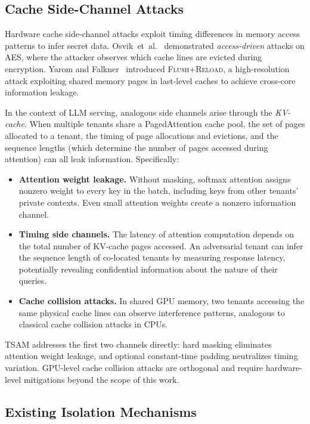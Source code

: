 \documentclass[11pt]{article}
\begin{document}
\subsection{Cache Side-Channel Attacks}
\label{sec:bg_sidechannel}

Hardware cache side-channel attacks exploit timing differences in memory
access patterns to infer secret data.
Osvik~et~al.~\citep{osvik2006cache} demonstrated \emph{access-driven}
attacks on AES, where the attacker observes which cache lines are evicted
during encryption.  Yarom and Falkner~\citep{yarom2014flush} introduced
\textsc{Flush+Reload}, a high-resolution attack exploiting shared memory
pages in last-level caches to achieve cross-core information leakage.

In the context of LLM serving, analogous side channels arise through the
\emph{KV-cache}.  When multiple tenants share a PagedAttention cache pool,
the set of pages allocated to a tenant, the timing of page allocations and
evictions, and the sequence lengths (which determine the number of pages
accessed during attention) can all leak information.  Specifically:
\begin{itemize}[leftmargin=*,itemsep=2pt]
  \item \textbf{Attention weight leakage.} Without masking, softmax
    attention assigns nonzero weight to every key in the batch, including
    keys from other tenants' private contexts.  Even small attention
    weights create a nonzero information channel.
  \item \textbf{Timing side channels.} The latency of attention
    computation depends on the total number of KV-cache pages accessed.
    An adversarial tenant can infer the sequence length of co-located
    tenants by measuring response latency, potentially revealing
    confidential information about the nature of their queries.
  \item \textbf{Cache collision attacks.} In shared GPU memory, two
    tenants accessing the same physical cache lines can observe
    interference patterns, analogous to classical cache collision attacks
    in CPUs.
\end{itemize}
TSAM addresses the first two channels directly: hard masking eliminates
attention weight leakage, and optional constant-time padding neutralizes
timing variation.  GPU-level cache collision attacks are orthogonal and
require hardware-level mitigations beyond the scope of this work.

\subsection{Existing Isolation Mechanisms}
\label{sec:bg_isolation}
\end{document}
